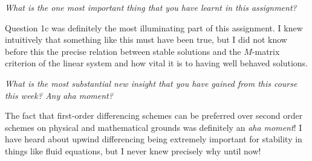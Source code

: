 \begin{afterword}{}
\textit{What is the one most important thing that you have learnt in this
assignment?}

Question 1c was definitely the most illuminating part of this assignment.
I knew intuitively that something like this must have been true, but
I did not know before this the precise relation between stable 
solutions and the $M$-matrix criterion of the linear system and how
vital it is to having well behaved solutions.

\vspace{0.5cm}

\textit{What is the most substantial new insight that you have gained 
from this course this week? Any aha moment?}

The fact that first-order differencing schemes can be preferred over
second order schemes on physical and mathematical grounds was definitely
an \textit{aha moment}! I have heard about upwind differencing being
extremely important for stability in things like fluid equations,
but I never knew precisely why until now!
\end{afterword}

\pagebreak

\begin{appendices}

\section{}\label{q1c}
\pagebreak
\section{}\label{advdiff}

\end{appendices}


